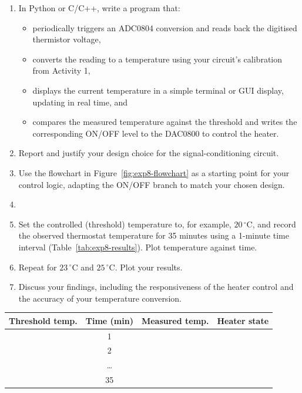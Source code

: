 \begin{procedure}
  \begin{enumerate}
    \item In Python or C/C++, write a program that:
          \begin{itemize}
            \item periodically triggers an ADC0804 conversion and reads back the digitised thermistor voltage,
            \item converts the reading to a temperature using your circuit's calibration from Activity 1,
            \item displays the current temperature in a simple terminal or GUI display, updating in real time, and
            \item compares the measured temperature against the threshold and writes the corresponding ON/OFF level to the DAC0800 to control the heater.
          \end{itemize}
    \item Report and justify your design choice for the signal-conditioning circuit.
    \item Use the flowchart in Figure~\ref{fig:exp8-flowchart} as a starting point for your control logic, adapting the ON/OFF branch to match your chosen design.
    \item     \item Set the controlled (threshold) temperature to, for example, $20\,^{\circ}\text{C}$, and record the observed thermostat temperature for 35 minutes using a 1-minute time interval (Table~\ref{tab:exp8-results}). Plot temperature against time.
    \item Repeat for $23\,^{\circ}\text{C}$ and $25\,^{\circ}\text{C}$. Plot your results.
    \item Discuss your findings, including the responsiveness of the heater control and the accuracy of your temperature conversion.
  \end{enumerate}
  \newpage

  \begin{boxedtable}
    \label{tab:exp8-results}
    \centering
    \begin{tabular}{cccc}
      \toprule
      Threshold temp. & Time (min) & Measured temp. & Heater state \\
      \midrule
                      & 1          &                &              \\
                      & 2          &                &              \\
                      & \ldots     &                &              \\
                      & 35         &                &              \\
      \bottomrule
    \end{tabular}
  \end{boxedtable}

\end{procedure}

